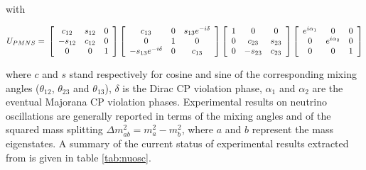 with

\begin{equation}
U_{PMNS}=\\
\left[ 
\begin{array}{ccc}
c_{12} & s_{12} & 0\\
-s_{12} & c_{12} & 0\\
0 & 0 & 1\\
\end{array}
\right]
\left[ 
\begin{array}{ccc}
c_{13} & 0 &s_{13}e^{-i\delta} \\
0 & 1 & 0\\
-s_{13}e^{-i\delta}& 0 & c_{13}\\
\end{array}
\right]
\left[
\begin{array}{ccc}
1 & 0 & 0\\
0 & c_{23} & s_{23} \\
0& -s_{23} & c_{23} \\
\end{array}
\right]
\left[ 
\begin{array}{ccc}
e^{i\alpha_1} & 0 & 0\\
0& e^{i\alpha_2} & 0\\
0 & 0 & 1\\
\end{array}
\right]
\label{eq:PMNS}
\end{equation}

where $c$ and $s$ stand respectively for cosine and sine of the corresponding  mixing angles
($\theta_{12}$, $\theta_{23}$ and $\theta_{13}$), $\delta$ is the Dirac CP violation phase,
$\alpha_1$ and $\alpha_{2}$  are the eventual Majorana CP violation phases.  Experimental results on neutrino oscillations are generally reported in terms of the mixing angles and of the squared mass splitting $\Delta m^2_{ab} = m^2_{a} - m^2_{b}$, where $a$ and $b$ represent the mass eigenstates. A summary of the current status of experimental results extracted from \cite{PDGOsc} is given in table \ref{tab:nuosc}.


